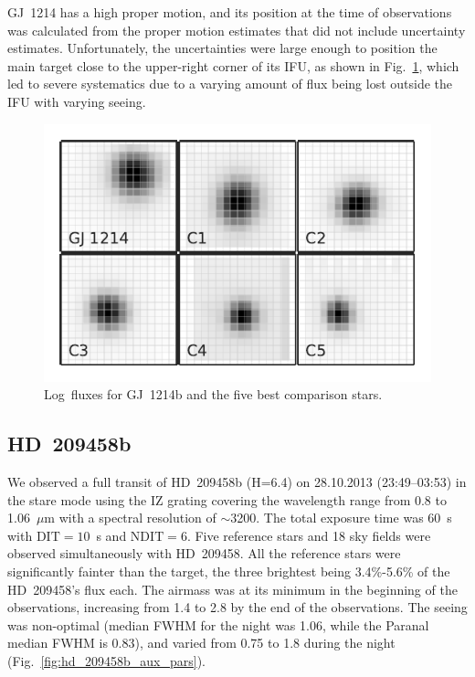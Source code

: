 \documentclass[useAMS,usenatbib]{mn2e}
\begin{document}
GJ~1214 has a high proper motion, and its position at the time of observations was calculated from the proper motion 
estimates that did not include uncertainty estimates. Unfortunately, the uncertainties were large enough to position 
the main target close to the upper-right corner of its IFU, as shown in  Fig.~\ref{fig:gj_1214_ifus}, which led to 
severe systematics due to a varying amount of flux being lost outside the IFU with varying seeing.

\begin{figure}
 \centering
 \includegraphics[width=\columnwidth]{gj_1214_ifus.pdf}
 \caption{Log~fluxes for GJ~1214b and the five best comparison stars.}
 \label{fig:gj_1214_ifus}
\end{figure}

\subsection{HD~209458b}
\label{sec:observations:hd_209458b}

We observed a full transit of HD~209458b (H=6.4) on 28.10.2013 (23:49--03:53) in the stare mode using the IZ grating 
covering the wavelength range from 0.8 to 1.06~$\mu$m with a spectral resolution of $\sim$3200. The total exposure time 
was 60~s with $\mathrm{DIT}=10$~s and $\mathrm{NDIT}=6$. Five reference stars and 18 sky fields were observed 
simultaneously with HD~209458. All the reference stars were significantly fainter than the target, the three brightest 
being 3.4\%-5.6\% of the HD~209458's flux each. The airmass was at its minimum in the beginning of the observations, 
increasing from 1.4 to 2.8 by the end of the observations. The seeing was non-optimal (median FWHM for the night was 
1.06\arcsec, while the Paranal median FWHM is 0.83\arcsec), and varied from 0.75\arcsec{} to 1.8\arcsec{} during the 
night (Fig.~\ref{fig:hd_209458b_aux_pars}).
\end{document}
